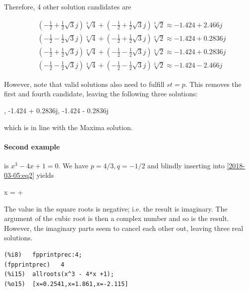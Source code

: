 Therefore, 4 other solution candidates are

\begin{align*}
&\left(-\frac{1}{2} + \frac{1}{2}\sqrt{3}j\right) \sqrt[3]{4} + \left(-\frac{1}{2} + \frac{1}{2}\sqrt{3}j\right) \sqrt[3]{2} \approx -1.424 + 2.466j\\
&\left(-\frac{1}{2} - \frac{1}{2}\sqrt{3}j\right) \sqrt[3]{4} + \left(-\frac{1}{2} + \frac{1}{2}\sqrt{3}j\right) \sqrt[3]{2} \approx -1.424 + 0.2836j \\
&\left(-\frac{1}{2} + \frac{1}{2}\sqrt{3}j\right) \sqrt[3]{4} + \left(-\frac{1}{2} - \frac{1}{2}\sqrt{3}j\right) \sqrt[3]{2} \approx -1.424 + 0.2836j \\
&\left(-\frac{1}{2} - \frac{1}{2}\sqrt{3}j\right) \sqrt[3]{4} + \left(-\frac{1}{2} - \frac{1}{2}\sqrt{3}j\right) \sqrt[3]{2} \approx -1.424 - 2.466j
\end{align*}

However, note that valid solutions also need to fulfill $st=p$. This removes the first and fourth candidate, leaving the following three solutions:

, -1.424 + 0.2836j, -1.424 - 0.2836j
\eee

which is in line with the Maxima solution.

\paragraph{Second example} is $x^3 - 4x + 1 = 0$. We have $p=4/3, q=-1/2$ and blindly inserting into \eqref{2018-03-05:eq2} yields

\bee
x =  + 
\eee

The value in the square roots is negative; i.e. the result is imaginary. The argument of the cubic root is then a complex number and so is the result. However, the imaginary parts seem to cancel each other out, leaving three real solutions.

\begin{verbatim}
(%i8)	fpprintprec:4;
(fpprintprec)	4
(%i15)	allroots(x^3 - 4*x +1);
(%o15)	[x=0.2541,x=1.861,x=-2.115]
\end{verbatim}